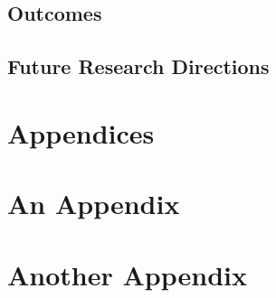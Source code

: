 \documentclass[11pt,twoside]{article}
\numberwithin{Theorem}{section}
\numberwithin{Definition}{section}
\numberwithin{Lemma}{section}
\numberwithin{Algorithm}{section}
\numberwithin{equation}{section}
\begin{document}
\subsection{Outcomes}
\label{subsec:outcomes}


\subsection{Future Research Directions}
\label{subsec:future}



\clearpage

\printbibliography
\clearpage

\appendix
\section*{Appendices}

\clearpage
\section{An Appendix}
\label{app:one}

\clearpage

\section{Another Appendix}
\label{app:two}
\end{document}
